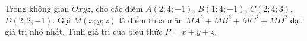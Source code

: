 \begin{ex}
Trong không gian $Oxyz$, cho các điểm $A(2;4;-1)$, $B(1;4;-1)$, $C(2;4;3)$, $D(2;2;-1)$. Gọi $M(x;y;z)$ là điểm thỏa mãn $MA^2+MB^2+MC^2+MD^2$ đạt giá trị nhỏ nhất. Tính giá trị của biểu thức $P=x+y+z$.
\end{ex}
